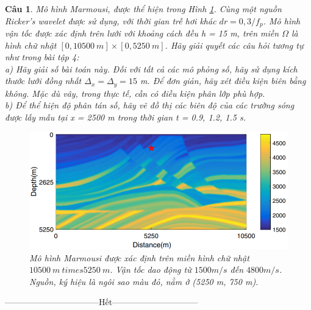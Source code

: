 \documentclass[answers]{exam}
\newtheorem{bt}{Câu}
\begin{document}
 \newpage 

\begin{bt}
Mô hình Marmousi, được thể hiện trong Hình \ref{fig:fig2}. Cùng một nguồn Ricker’s wavelet được sử dụng, với thời gian trễ hơi khác 
$dr = 0,3 / f_p$. Mô hình vận tốc được xác định trên lưới với khoảng cách đều h = 15 m, trên miền $\Omega$ là hình chữ nhật 
$[0, 10500 \ m] \times [0, 5250 \ m ]$. Hãy giải quyết các câu hỏi tương tự như trong bài tập 4: \\ 
a) Hãy giải số bài toán này. Đối với tất cả các mô phỏng số, hãy sử dụng kích thước lưới đồng nhất $\Delta_x = \Delta_y = 15$ m. Để đơn giản, hãy xét điều kiện biên bằng không. Mặc dù vây, trong thực tế, cần có điều kiện phân lớp phù hợp. \\
b) Để thể hiện độ phân tán số, hãy vẽ đồ thị các biên độ của các trường sóng được lấy mẫu tại x = 2500 m trong thời gian t = 0.9, 1.2, 1.5 s. \\
%
\begin{figure}[h!]
	\centering
	\includegraphics[scale = 0.7]{Fig2}
	\caption[]{Mô hình Marmousi được xác định trên miền hình chữ nhật $ 10500 \ m \ times 5250 \ m $. Vận tốc dao động từ $ 1500 m / s $ đến $ 4800 m / s $. Nguồn, ký hiệu là ngôi sao màu đỏ, nằm ở (5250 m, 750 m). }
	\label{fig:fig2}
\end{figure}
\end{bt}

\centerline{———————————Hết——————————}

% 
   
\end{document}
